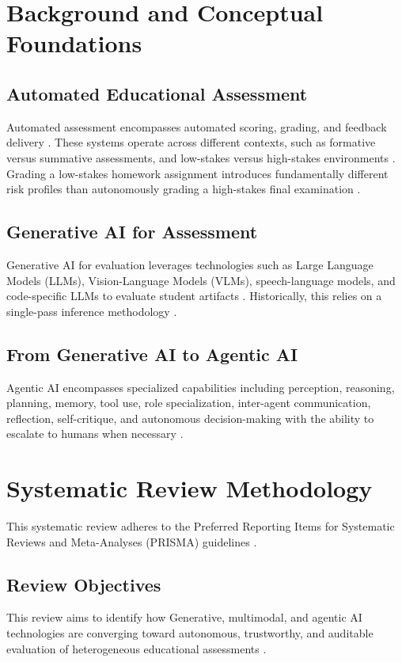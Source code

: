 \documentclass[11pt,a4paper]{article}
\begin{document}
\section{Background and Conceptual Foundations}

\subsection{Automated Educational Assessment}
Automated assessment encompasses automated scoring, grading, and feedback delivery \cite{P013}. These systems operate across different contexts, such as formative versus summative assessments, and low-stakes versus high-stakes environments \cite{P013}. Grading a low-stakes homework assignment introduces fundamentally different risk profiles than autonomously grading a high-stakes final examination \cite{P014}.

\subsection{Generative AI for Assessment}
Generative AI for evaluation leverages technologies such as Large Language Models (LLMs), Vision-Language Models (VLMs), speech-language models, and code-specific LLMs to evaluate student artifacts \cite{P020, P029}. Historically, this relies on a single-pass inference methodology \cite{P003}.

\subsection{From Generative AI to Agentic AI}
Agentic AI encompasses specialized capabilities including perception, reasoning, planning, memory, tool use, role specialization, inter-agent communication, reflection, self-critique, and autonomous decision-making with the ability to escalate to humans when necessary \cite{P002, P008, P027}. 

\section{Systematic Review Methodology}
This systematic review adheres to the Preferred Reporting Items for Systematic Reviews and Meta-Analyses (PRISMA) guidelines \cite{P013}. 

\subsection{Review Objectives}
This review aims to identify how Generative, multimodal, and agentic AI technologies are converging toward autonomous, trustworthy, and auditable evaluation of heterogeneous educational assessments \cite{P013}.
\end{document}
